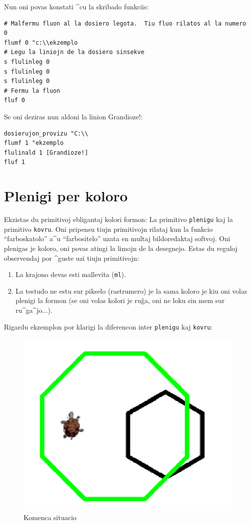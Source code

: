 Nun oni povas konstati ^cu la skribado funkciis:

\begin{verbatim}
# Malfermu fluon al la dosiero legota.  Tiu fluo rilatos al la numero 0
flumf 0 "c:\\ekzemplo
# Legu la liniojn de la dosiero sinsekve
s flulinleg 0
s flulinleg 0
s flulinleg 0
# Fermu la fluon
fluf 0
\end{verbatim}

Se oni deziras nun aldoni la linion \og Grandioze!\fg:

\begin{verbatim}
dosierujon_provizu "C:\\
flumf 1 "ekzemplo
flulinald 1 [Grandioze!]
fluf 1
\end{verbatim}

\section{Plenigi per koloro}

Ekzistas du primitivoj ebligantaj kolori formon:  La
primitivo \texttt{plenigu} kaj  la primitivo
\texttt{kovru}.  Oni pripensu tiujn primitivojn rilataj kun la funkcio
``farboskatolo'' a^u ``farbositelo'' uzata en multaj bildoredaktaj
softvoj.  Oni plenigas je koloro, oni povas atingi la limojn de la
desegnejo.  Estas du reguloj observendaj por ^guste uzi tiujn
primitivojn:
\begin{enumerate}
\item La krajono devas esti mallevita (\texttt{ml}).
\item La testudo ne estu sur pikselo (rastrumero) je la sama koloro je
  kiu oni volas plenigi la formon (se oni volas kolori je ruĝa, oni ne
  loku sin mem sur ru^ga^jo...).
\end{enumerate} 
Rigardu ekzemplon por klarigi la diferencon inter \texttt{plenigu} kaj
\texttt{kovru}:
\begin{figure}[h]
  \begin{center}
    \includegraphics*[scale=0.2]{bildoj/remplis.png}
    \caption{Komenca situacio}
  \end{center}
\end{figure}

